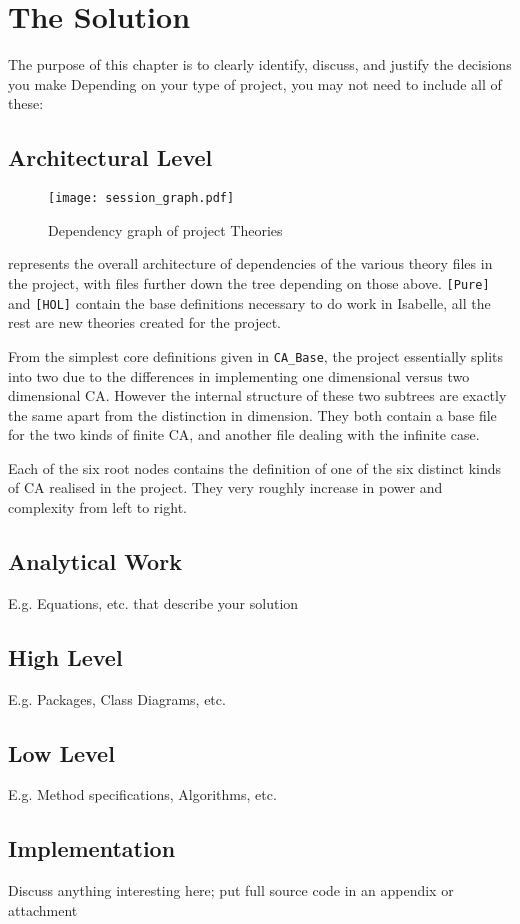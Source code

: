 \chapter{The Solution}

The purpose of this chapter is to clearly identify, discuss, and justify the decisions you make
Depending on your type of project, you may not need to include all of these:


\section{Architectural Level}


\begin{figure}[h]
    \centering
    \texttt{[image: session\_graph.pdf]}
    \caption{Dependency graph of project Theories}
    \label{fig:graph}
\end{figure}

 represents the overall architecture of dependencies of the various theory files in the project,
with files further down the tree depending on those above.
\texttt{[Pure]} and \texttt{[HOL]} contain the base definitions necessary to do work in Isabelle,
all the rest are new theories created for the project.

From the simplest core definitions given in \texttt{CA_Base},
the project essentially splits into two due to the differences in implementing one dimensional versus two dimensional CA.
However the internal structure of these two subtrees are exactly the same apart from the distinction in dimension.
They both contain a base file for the two kinds of finite CA,
and another file dealing with the infinite case.

Each of the six root nodes contains the definition of one of the six distinct kinds of CA realised in the project.
They very roughly increase in power and complexity from left to right.

\section{Analytical Work}

E.g. Equations, etc. that describe your solution


\section{High Level}

E.g. Packages, Class Diagrams, etc.


\section{Low Level}

E.g. Method specifications, Algorithms, etc.


\section{Implementation}

Discuss anything interesting here; put full source code in an appendix or attachment
